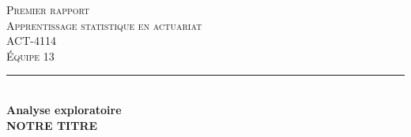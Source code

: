 %
%

\begin{titlepage}

\newcommand{\HRule}{\rule{\linewidth}{0.5mm}} %

\center %
\textsc{\LARGE Premier rapport}\\[1.0cm] %
\textsc{\Large Apprentissage statistique en actuariat}\\[0.2cm] %
\textsc{\large ACT-4114}\\[0.7cm] %
\textsc{\large Équipe 13}\\[0.7cm] %


\HRule \\[0.4cm]
{ \Large \bfseries Analyse exploratoire}\\[0.20cm] { \huge \bfseries NOTRE TITRE}\\[0.20cm]


\end{titlepage}
